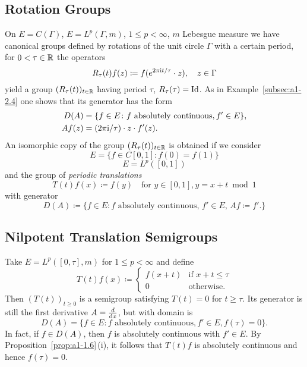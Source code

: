 \subsection{Rotation Groups}\label{subsec:a1-2.5}
On $E = C(\Gamma)$, \resp $E = L^{p}(\Gamma,m)$, $1 \leq p < \infty$, $m$ Lebesgue measure we have canonical groups defined by rotations of the unit circle $\Gamma$ with a certain period, \ie for $0 < \tau \in \mathbb{R}$ the operators
\[
    R_{\tau}(t)f(z) \coloneqq f(e^{2\pi \mathrm{i} t/\tau}\cdot z), \quad z \in \Gamma
\]
yield a group $(R_{\tau}(t))_{t \in \mathbb{R}}$ having period $\tau$, \ie $R_{\tau}(\tau) = \operatorname{Id}$.
As in Example~\ref{subsec:a1-2.4} one shows that its generator has the form
\begin{align*}
    D(A) &= \{f \in E \colon f \text{ absolutely continuous}, f' \in E\}, \\
    Af(z)&= (2\pi \mathrm{i}/\tau) \cdot z \cdot f'(z).
\end{align*}
An isomorphic copy of the group $(R_{\tau}(t))_{t \in \mathbb{R}}$ is obtained if we consider 
\[
E = \{f \in C\left[ 0,1 \right] \colon f(0) = f(1)\}
\]
\resp 
\[
E = L^{p}(\left[ 0,1 \right])
\]
and the group of \emph{periodic translations}
\[
    T(t)f(x) \coloneqq f(y) \quad \text{for $y \in \left[ 0,1 \right], y = x+t \bmod 1$} 
\]
with generator
\[
    D(A) \coloneqq \{f \in E \colon f \text{ absolutely continuous, $f' \in E$, $Af \coloneqq f'$.}\}
\]
\subsection{Nilpotent Translation Semigroups}\label{subsec:a1-2.6}
Take $E = L^{p}([0,\tau],m)$ for $1 \leq p < \infty$ and define
\[
    T(t)f(x) \coloneqq \begin{cases}
        f(x+t) & \text{if } x+t \leq \tau \\
        0 & \text{otherwise.}
    \end{cases}
\]
Then $(T(t))_{t\geq 0}$ is a semigroup satisfying $T(t) = 0$ for $t \geq \tau$.
Its generator is still the first derivative $A = \frac{d}{\mathop{}\!\mathrm{d}{x}}$, but with domain is 
\[
D(A) = \{f \in E \colon f \text{ absolutely continuous}, f' \in E, f(\tau) = 0\}.
\]
In fact, if $f \in D(A)$, then $f$ is absolutely continuous with $f' \in E$.
By Proposition~\ref{prop:a1-1.6}\,(i), it follows that $T(t)f$ is absolutely continuous and hence $f(\tau) = 0$.
